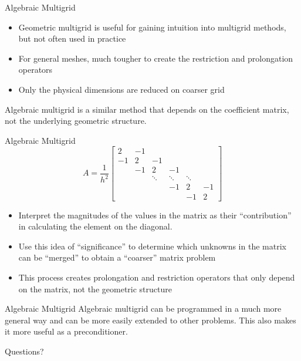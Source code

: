 \documentclass[11pt]{beamer}
\begin{document}
  \begin{frame}{Algebraic Multigrid}
    \begin{itemize}
    \item Geometric multigrid is useful for gaining intuition into multigrid
      methods, but not often used in practice
    \item For general meshes, much tougher to create the restriction and
      prolongation operators
    \item Only the physical dimensions are reduced on coarser grid
    \end{itemize}
    \vspace{.2in}
    Algebraic multigrid is a similar method that depends on the coefficient
    matrix, not the underlying geometric structure.
  \end{frame}
  \begin{frame}{Algebraic Multigrid}
    \begin{equation*}
      A = \frac{1}{h^2}
      \begin{bmatrix}
        2  & -1 &        &        &        &   \\
        -1 &  2 & -1     &        &        &   \\
        & -1 &  2     &     -1 &        &   \\
        &    & \ddots & \ddots & \ddots &   \\
        &    &        &     -1 &      2 & -1 \\
        &    &        &        &     -1 &  2
      \end{bmatrix}
    \end{equation*}
    \begin{itemize}
    \item Interpret the magnitudes of the values in the matrix as their ``contribution''
      in calculating the element on the diagonal.
    \item Use this idea of ``significance'' to determine which unknowns in the
      matrix can be ``merged'' to obtain a ``coarser'' matrix problem
    \item This process creates prolongation and restriction operators that only
      depend on the matrix, not the geometric structure
    \end{itemize}

  \end{frame}
  \begin{frame}{Algebraic Multigrid}
    Algebraic multigrid can be programmed in a much more general way and
    can be more easily extended to other problems.  This also makes it more useful
    as a preconditioner.
  \end{frame}
  \begin{frame}{Questions?}
  \end{frame}
\end{document}
